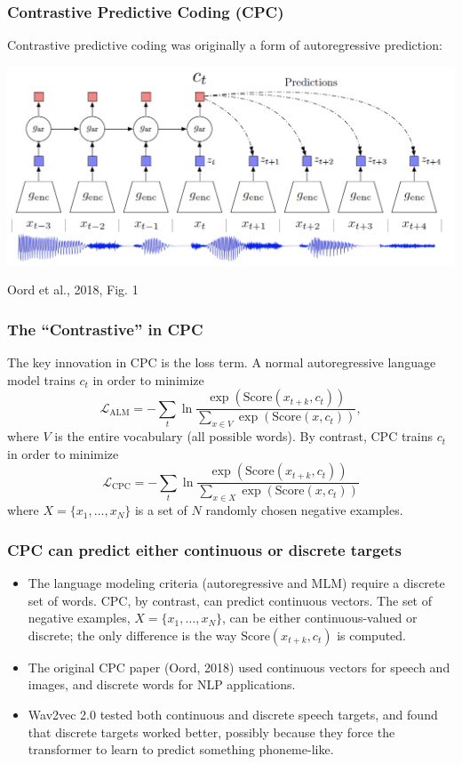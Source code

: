 \documentclass{beamer}
\begin{document}
\begin{frame}
  \frametitle{Contrastive Predictive Coding (CPC)}

  Contrastive predictive coding was originally a form of autoregressive prediction:

  \centerline{\includegraphics[width=\textwidth]{figs/oord2018fig1.png}}

  \centerline{\tiny Oord et al., 2018, Fig. 1}
\end{frame}

\begin{frame}
  \frametitle{The ``Contrastive'' in CPC}

  The key innovation in CPC is the loss term.  A normal autoregressive
  language model trains $c_t$ in order to minimize
  \begin{displaymath}
    {\mathcal L}_{\text{ALM}} = -\sum_t \ln\frac{\exp\left(\text{Score}(x_{t+k},c_t)\right)}{\sum_{x\in V}\exp\left(\text{Score}(x,c_t)\right)},
  \end{displaymath}
  where $V$ is the entire vocabulary (all possible words).  By
  contrast, CPC trains $c_t$ in order to minimize
  \begin{displaymath}
    {\mathcal L}_{\text{CPC}} = -\sum_t \ln\frac{\exp\left(\text{Score}(x_{t+k},c_t)\right)}{\sum_{x\in X}\exp\left(\text{Score}(x,c_t)\right)}
  \end{displaymath}
  where $X=\{x_1,\ldots,x_N\}$ is a set of $N$ randomly chosen
  negative examples.
\end{frame}

\begin{frame}
  \frametitle{CPC can predict either continuous or discrete targets}

  \begin{itemize}
  \item 
    The language modeling criteria (autoregressive and MLM) require a
    discrete set of words.  CPC, by contrast, can predict continuous
    vectors.  The set of negative examples, $X=\{x_1,\ldots,x_N\}$,
    can be either continuous-valued or discrete; the only difference
    is the way $\text{Score}(x_{t+k},c_t)$ is computed.
  \item
    The original CPC paper (Oord, 2018) used continuous vectors for
    speech and images, and discrete words for NLP applications.
  \item
    Wav2vec 2.0 tested both continuous and discrete speech targets,
    and found that discrete targets worked better, possibly because
    they force the transformer to learn to predict something
    phoneme-like.
  \end{itemize}
\end{frame}
\end{document}
